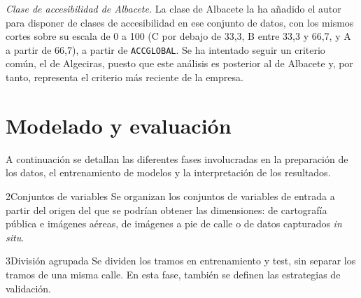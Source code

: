 \noindent\textit{Clase de accesibilidad de Albacete.} La clase de Albacete la ha añadido el autor para disponer de clases de accesibilidad en ese conjunto de datos, con los mismos cortes sobre su escala de 0 a 100 (C por debajo de 33,3, B entre 33,3 y 66,7, y A a partir de 66,7), a partir de \texttt{ACCGLOBAL}. Se ha intentado seguir un criterio común, el de Algeciras, puesto que este análisis es posterior al de Albacete y, por tanto, representa el criterio más reciente de la empresa.

\section{Modelado y evaluación}
\label{sec:arq-modelado-evaluacion}

A continuación se detallan las diferentes fases involucradas en la preparación de los datos, el entrenamiento de modelos y la interpretación de los resultados.
\\

\begin{fichacomponente}{2}{Conjuntos de variables}{}
  Se organizan los conjuntos de variables de entrada a partir del origen del que se podrían obtener las dimensiones: de cartografía pública e imágenes aéreas, de imágenes a pie de calle o de datos capturados \textit{in situ}.
\end{fichacomponente}

\begin{fichacomponente}{3}{División agrupada}{}
  Se dividen los tramos en entrenamiento y test, sin separar los tramos de una misma calle. En esta fase, también se definen las estrategias de validación.
\end{fichacomponente}

